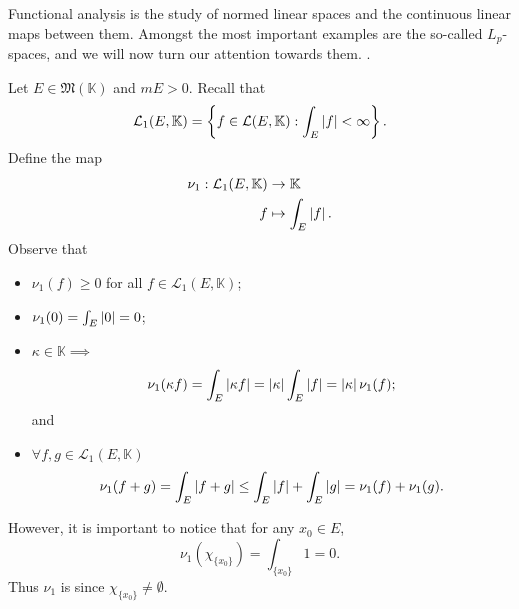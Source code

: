 \documentclass[notoc,notitlepage]{tufte-book}
\begin{document}
Functional analysis is the study of normed linear spaces and the continuous
linear maps between them. Amongst the most important examples are the so-called
$L_p$-spaces, and we will now turn our attention towards them. .

\begin{eg}
  Let $E \in \mathfrak{M}(\mathbb{K})$ and $mE > 0$. Recall that
  \begin{equation*}
    \mathcal{L}_1(E, \mathbb{K}) = \left\{ f \in \mathcal{L}(E, \mathbb{K}) :
    \int_{E} \left|f\right| < \infty \right\}.
  \end{equation*}
  Define the map
  \begin{align*}
    \nu_1 : \mathcal{L}_1(E, \mathbb{K}) &\to \mathbb{K} \\
    f & \mapsto \int_{E} \left|f\right|.
  \end{align*}
  Observe that
  \begin{itemize}
    \item $\nu_1(f) \geq 0$ for all $f \in \mathcal{L}_1(E, \mathbb{K})$;
    \item $\nu_1(0) = \int_{E} \left|0\right| = 0$;
    \item $\kappa \in \mathbb{K} \implies$ 
      \begin{equation*}
        \nu_1(\kappa f) = \int_{E} \left|\kappa f\right| = \left|\kappa\right| \int_{E}
        \left|f\right| = \left|\kappa\right| \nu_1(f);
      \end{equation*}
      and
    \item $\forall f, g \in \mathcal{L}_1(E, \mathbb{K})$ 
      \begin{equation*}
        \nu_1(f + g) = \int_{E} \left|f + g\right| \leq \int_{E} \left|f\right| + \int_{E}
        \left|g\right| = \nu_1(f) + \nu_1(g).
      \end{equation*}
  \end{itemize}
  However, it is important to notice that for any $x_0 \in E$,
  \begin{equation*}
    \nu_1(\chi_{\{x_0\}}) = \int_{\{ x_0 \}} 1 = 0.
  \end{equation*}
  Thus $\nu_1$ is  since $\chi_{\{x_0\}} \neq \emptyset$.
\end{eg}
\end{document}

